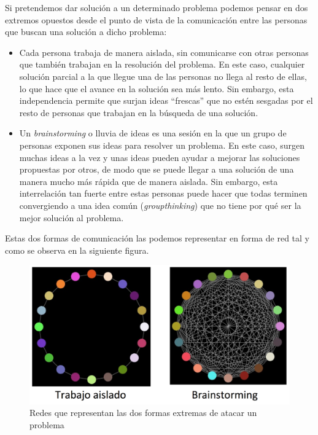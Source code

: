 \documentclass[]{article}
\begin{document}
Si pretendemos dar solución a un determinado problema podemos pensar en
dos extremos opuestos desde el punto de vista de la comunicación entre
las personas que buscan una solución a dicho problema:

\begin{itemize}
\itemsep1pt\parskip0pt
\item
  Cada persona trabaja de manera aislada, sin comunicarse con otras
  personas que también trabajan en la resolución del problema. En este
  caso, cualquier solución parcial a la que llegue una de las personas
  no llega al resto de ellas, lo que hace que el avance en la solución
  sea más lento. Sin embargo, esta independencia permite que surjan
  ideas ``frescas'' que no estén sesgadas por el resto de personas que
  trabajan en la búsqueda de una solución.
\item
  Un \emph{brainstorming} o lluvia de ideas es una sesión en la que un
  grupo de personas exponen sus ideas para resolver un problema. En este
  caso, surgen muchas ideas a la vez y unas ideas pueden ayudar a
  mejorar las soluciones propuestas por otros, de modo que se puede
  llegar a una solución de una manera mucho más rápida que de manera
  aislada. Sin embargo, esta interrelación tan fuerte entre estas
  personas puede hacer que todas terminen convergiendo a una idea común
  (\emph{groupthinking}) que no tiene por qué ser la mejor solución al
  problema.
\end{itemize}

Estas dos formas de comunicación las podemos representar en forma de red
tal y como se observa en la siguiente figura.

\begin{figure}[htbp]
\centering
\includegraphics{../images/tema08/redInnovacion.png}
\caption{Redes que representan las dos formas extremas de atacar un
problema}
\end{figure}
\end{document}

